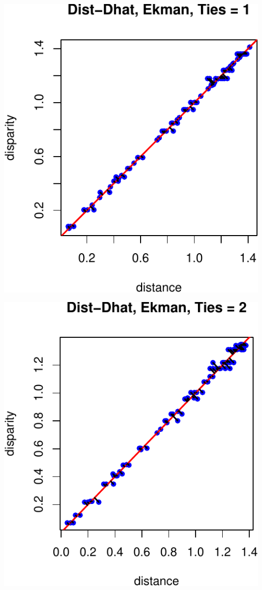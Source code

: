 \documentclass[
  12pt,
]{article}
\begin{document}
\begin{center}\includegraphics{smacofRO_files/figure-latex/plotekmandd-1} \end{center}

\begin{center}\includegraphics{smacofRO_files/figure-latex/plotekmandd-2} \end{center}
\end{document}
